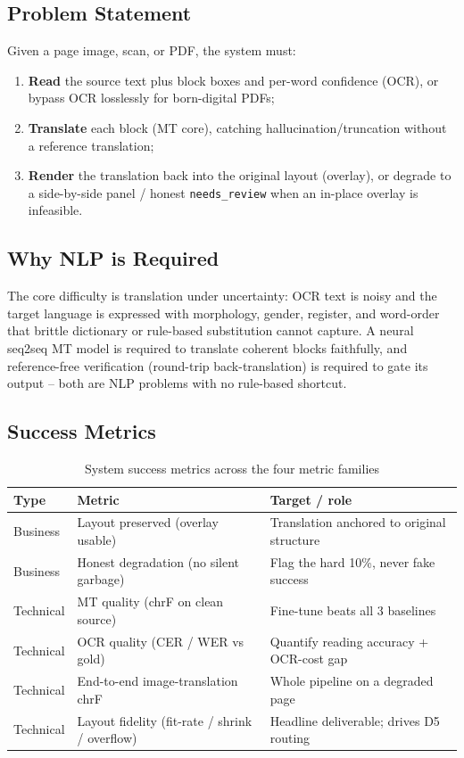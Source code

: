 \documentclass[12pt,a4paper]{article}
\begin{document}
\subsection{Problem Statement}

Given a page image, scan, or PDF, the system must:
\begin{enumerate}
  \item \textbf{Read} the source text plus block boxes and per-word confidence (OCR), or bypass OCR losslessly for born-digital PDFs;
  \item \textbf{Translate} each block (MT core), catching hallucination/truncation without a reference translation;
  \item \textbf{Render} the translation back into the original layout (overlay), or degrade to a side-by-side panel / honest \texttt{needs\_review} when an in-place overlay is infeasible.
\end{enumerate}

\subsection{Why NLP is Required}

The core difficulty is translation under uncertainty: OCR text is noisy and the target language is expressed with morphology, gender, register, and word-order that brittle dictionary or rule-based substitution cannot capture. A neural seq2seq MT model is required to translate coherent blocks faithfully, and reference-free verification (round-trip back-translation) is required to gate its output -- both are NLP problems with no rule-based shortcut.

\subsection{Success Metrics}

\begin{table}[H]
\centering
\caption{System success metrics across the four metric families}
\begin{tabular}{lll}
\toprule
\textbf{Type} & \textbf{Metric} & \textbf{Target / role} \\
\midrule
Business & Layout preserved (overlay usable) & Translation anchored to original structure \\
Business & Honest degradation (no silent garbage) & Flag the hard 10\%, never fake success \\
Technical & MT quality (chrF on clean source) & Fine-tune beats all 3 baselines \\
Technical & OCR quality (CER / WER vs gold) & Quantify reading accuracy + OCR-cost gap \\
Technical & End-to-end image-translation chrF & Whole pipeline on a degraded page \\
Technical & Layout fidelity (fit-rate / shrink / overflow) & Headline deliverable; drives D5 routing \\
\bottomrule
\end{tabular}
\end{table}
\end{document}

